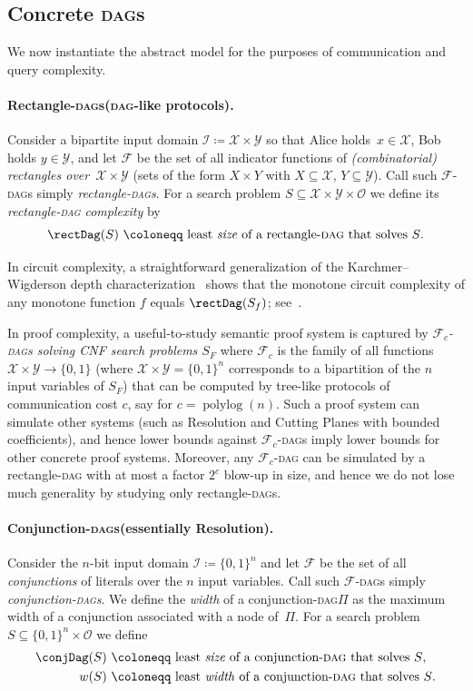 \documentclass{toc}
\DeclareMathOperator{\polylog}{polylog}
\newcommand{\DAG}{\textsc{dag}}
\newcommand{\DAGs}{\textsc{dag}s\xspace}
\newcommand{\DAGspace}{\textsc{dag}\xspace}
\newcommand{\calI}{\mathcal{I}}
\newcommand{\calO}{\mathcal{O}}
\newcommand{\calF}{\mathcal{F}}
\newcommand{\calX}{\mathcal{X}}
\newcommand{\calY}{\mathcal{Y}}
\begin{document}
\subsection{Concrete \DAGs}

We now instantiate the abstract model for the purposes of communication and query complexity.

\paragraph{Rectangle-\DAGs (\DAG-like protocols).}
Consider a bipartite input domain $\calI\coloneqq \calX\times\calY$ so that Alice holds~$x\in\calX$, Bob holds $y\in\calY$, and let $\calF$ be the set of all indicator functions of \emph{(combinatorial) rectangles over~$\calX\times\calY$} (sets of the form $X\times Y$ with $X\subseteq\calX$, $Y\subseteq\calY$). Call such $\calF$-\DAGs simply \emph{rectangle-\DAGs}. For a search problem $S\subseteq \calX\times\calY\times\calO$ we define its \emph{rectangle-\DAGspace complexity} by
\[
\rectDag(S)~\coloneqq~\text{least \emph{size} of a rectangle-\DAGspace that solves $S$}.
\]

In circuit complexity, a straightforward generalization of the Karchmer--Wigderson depth characterization~\cite{karchmer88monotone} shows that the monotone circuit complexity of any monotone function $f$ equals $\rectDag(S_f)$; see~\cite{pudlak10extracting,sokolov17dag}.

In proof complexity, a useful-to-study semantic proof system is captured by \emph{$\calF_c$-\DAGs solving CNF search problems $S_F$} where $\calF_c$ is the family of all functions $\calX\times\calY\to\{0,1\}$ (where $\calX\times\calY=\{0,1\}^n$ corresponds to a bipartition of the $n$ input variables of $S_F$) that can be computed by tree-like protocols of communication cost $c$, say for $c=\polylog(n)$. Such a proof system can simulate other systems (such as Resolution and Cutting Planes with bounded coefficients), and hence lower bounds against $\calF_c$-\DAGs imply lower bounds for other concrete proof systems. Moreover, any $\calF_c$-\DAGspace can be simulated by a rectangle-\DAGspace with at most a factor $2^c$ blow-up in size, and hence we do not lose much generality by studying only rectangle-\DAGs.

\paragraph{Conjunction-\DAGs (essentially Resolution).}
Consider the $n$-bit input domain $\calI\coloneqq\{0,1\}^n$ and let $\calF$ be the set of all \emph{conjunctions} of literals over the $n$ input variables. Call such $\calF$-\DAGs simply \emph{conjunction-\DAGs}. We define the \emph{width} of a conjunction-\DAGspace $\Pi$ as the maximum width of a conjunction associated with a node of~$\Pi$. For a search problem $S\subseteq \{0,1\}^n\times\calO$ we define
\begin{align*}
\conjDag(S)&~\coloneqq~\text{least \emph{size} of a conjunction-\DAGspace that solves $S$},\\
w(S)&~\coloneqq~\text{least \emph{width} of a conjunction-\DAGspace that solves $S$}.
\end{align*}
\end{document}
